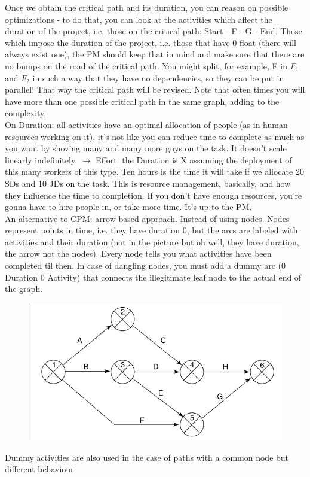 \noindent Once we obtain the critical path and its duration, you can reason on possible optimizations - to do that, you can look at the activities which affect the duration of the project, i.e. those on the critical path: Start - F - G - End. Those which impose the duration of the project, i.e. those that have 0 float (there will always exist one), the PM should keep that in mind and make sure that there are no bumps on the road of the critical path. You might split, for example, F in $F_1$ and $F_2$ in such a way that they have no dependencies, so they can be put in parallel! That way the critical path will be revised. Note that often times you will have more than one possible critical path in the same graph, adding to the complexity.\\

\noindent On Duration: all activities have an optimal allocation of people (as in human resources working on it), it's not like you can reduce time-to-complete as much as you want by shoving many and many more guys on the task. It doesn't scale linearly indefinitely. $\rightarrow$ Effort: the Duration is X assuming the deployment of this many workers of this type. Ten hours is the time it will take if we allocate 20 SDs and 10 JDs on the task. This is resource management, basically, and how they influence the time to completion. If you don't have enough resources, you're gonna have to hire people in, or take more time. It's up to the PM.\\

\noindent An alternative to CPM: arrow based approach. Instead of using nodes. Nodes represent points in time, i.e. they have duration 0, but the arcs are labeled with activities and their duration (not in the picture but oh well, they have duration, the arrow not the nodes). Every node tells you what activities have been completed til then. In case of dangling nodes, you must add a dummy arc (0 Duration 0 Activity) that connects the illegitimate leaf node to the actual end of the graph.
\begin{figure} [H]
    \centering
    \includegraphics[width=0.75\linewidth]{Figures//03/cpm_arrow.png}
    \label{fig:cpmarrow}
\end{figure}
\noindent Dummy activities are also used in the case of paths with a common node but different behaviour:

